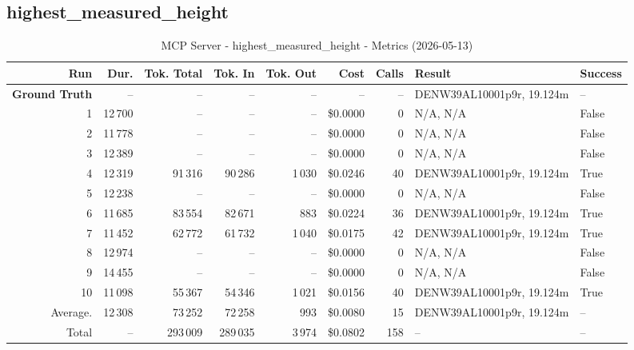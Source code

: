 \documentclass[a4paper,11pt]{article}
\begin{document}
\clearpage
\subsection{highest\_measured\_height}

\begin{table}[ht]
\centering
\scriptsize
\caption{MCP Server - highest\_measured\_height - Metrics (2026-05-13)}
\label{tab:mcp\_highest\_measured\_height\_metrics\_2026-05-13}
\begin{tabular}{r r r r r r r p{3cm} l}
\hline
Run & Dur. & Tok. Total & Tok. In & Tok. Out & Cost & Calls & Result & Success \\
\hline
\textbf{Ground Truth} & -- & -- & -- & -- & -- & -- & DENW39AL10001p9r, 19.124m & -- \\
\hline
1 & 12\,700 & -- & -- & -- & \$0.0000 & 0 & N/A, N/A & False \\
2 & 11\,778 & -- & -- & -- & \$0.0000 & 0 & N/A, N/A & False \\
3 & 12\,389 & -- & -- & -- & \$0.0000 & 0 & N/A, N/A & False \\
4 & 12\,319 & 91\,316 & 90\,286 & 1\,030 & \$0.0246 & 40 & DENW39AL10001p9r, 19.124m & True \\
5 & 12\,238 & -- & -- & -- & \$0.0000 & 0 & N/A, N/A & False \\
6 & 11\,685 & 83\,554 & 82\,671 & 883 & \$0.0224 & 36 & DENW39AL10001p9r, 19.124m & True \\
7 & 11\,452 & 62\,772 & 61\,732 & 1\,040 & \$0.0175 & 42 & DENW39AL10001p9r, 19.124m & True \\
8 & 12\,974 & -- & -- & -- & \$0.0000 & 0 & N/A, N/A & False \\
9 & 14\,455 & -- & -- & -- & \$0.0000 & 0 & N/A, N/A & False \\
10 & 11\,098 & 55\,367 & 54\,346 & 1\,021 & \$0.0156 & 40 & DENW39AL10001p9r, 19.124m & True \\
\hline
Average. & 12\,308 & 73\,252 & 72\,258 & 993 & \$0.0080 & 15 & DENW39AL10001p9r, 19.124m & -- \\
Total & -- & 293\,009 & 289\,035 & 3\,974 & \$0.0802 & 158 & -- & -- \\
\hline
\end{tabular}
\end{table}

\clearpage
\end{document}
